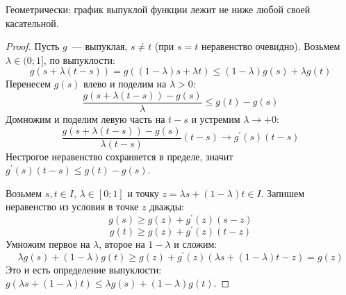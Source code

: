 

\begin{remark}
  Геометрически: график выпуклой функции лежит не ниже любой своей касательной.
\end{remark}

\begin{proof}
  \proofpart{$\Rightarrow$}
  Пусть $g$~--- выпуклая, $s \ne t$ (при $s = t$ неравенство очевидно). Возьмем $\lambda \in (0;1]$, по выпуклости:
  \[
  g(s + \lambda(t-s)) = g((1-\lambda)s + \lambda t) \le (1-\lambda) g(s) + \lambda g(t)
  \]
  Перенесем $g(s)$ влево и поделим на $\lambda > 0$:
  \[
  \frac{g(s + \lambda(t-s)) - g(s)}{\lambda} \le g(t) - g(s)
  \]
  Домножим и поделим левую часть на $t-s$ и устремим $\lambda \rightarrow +0$:
  \[
  \frac{g(s + \lambda(t-s)) - g(s)}{\lambda (t-s)} (t-s) \rightarrow g^{\prime}(s)(t-s)
  \]
  Нестрогое неравенство сохраняется в пределе, значит $g^{\prime}(s)(t-s) \le g(t) - g(s)$.

  \proofpart{$\Leftarrow$}
  Возьмем $s,t \in I$, $\lambda \in [0;1]$ и точку $z = \lambda s + (1-\lambda) t \in I$. Запишем неравенство из условия в точке $z$ дважды:
  \[
  g(s) \ge g(z) + g^{\prime}(z)(s-z)
  \]
  \[
  g(t) \ge g(z) + g^{\prime}(z)(t-z)
  \]
  Умножим первое на $\lambda$, второе на $1-\lambda$ и сложим:
  \[
  \lambda g(s) + (1-\lambda) g(t) \ge g(z) + g^{\prime}(z)(\lambda s + (1-\lambda) t - z) = g(z)
  \]
  Это и есть определение выпуклости: $g(\lambda s + (1-\lambda)t) \le \lambda g(s) + (1-\lambda) g(t)$.
\end{proof}
